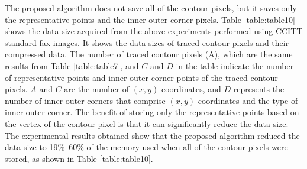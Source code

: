 \documentclass[sensors,article,accept,moreauthors,pdftex,10pt,a4paper]{mdpi}
\begin{document}
The proposed algorithm does not save all of the contour pixels, but it saves only the representative points and the inner-outer corner pixels. Table \ref{table:table10} shows the data size acquired from the above experiments performed using CCITT standard fax images. It shows the data sizes of traced contour pixels and their compressed data. The number of traced contour pixels (A), which are the same results from Table \ref{table:table7}, and $C$ and $D$ in the table indicate the number of representative points and inner-outer corner points of the traced contour pixels. $A$ and $C$ are the number of $(x, y)$ coordinates, and $D$ represents the number of inner-outer corners that comprise $(x, y)$ coordinates and the type of inner-outer corner. The benefit of storing only the representative points based on the vertex of the contour pixel is that it can significantly reduce the data size. The experimental results obtained show that the proposed algorithm reduced the data size to 19\%--60\% of the memory used when all of the contour pixels were stored, as shown in Table \ref{table:table10}.


\end{document}
